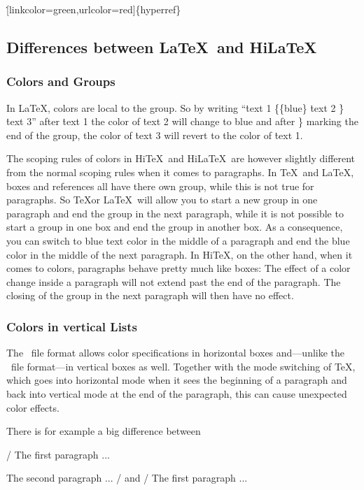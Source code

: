 \.{[linkcolor=green,urlcolor=red]\{hyperref\}}

\subsection{Differences between \LaTeX\ and Hi\LaTeX}

\subsubsection{Colors and Groups}
In \LaTeX, colors are local to the group. So by writing
``\.{text 1} \.{\{}\.{\{blue\}} \.{text 2} \.{\}} \.{text 3}''
after \.{text 1} the color of \.{text 2} will change to  blue and after \.{\}}
marking the end of the group, the color of \.{text 3} will revert to the
color of \.{text 1}.

The scoping rules of colors in Hi\TeX\ and Hi\LaTeX\ are however slightly
different from the normal scoping rules when it comes to paragraphs.
In \TeX\ and \LaTeX, boxes and references all have there own group,
while this is not true for paragraphs.
So \TeX or \LaTeX\ will allow you to start a new group in one paragraph and
end the group in the next paragraph, while it is not possible to start a
group in one box and end the group in another box. As a consequence,
you can switch to blue text color in the middle of a paragraph and end the blue
color in the middle of the next paragraph.
In Hi\TeX, on the other hand, when it comes to colors,
paragraphs behave pretty much like boxes: The effect of a color change inside
a paragraph will not extend past the end of the paragraph. The closing of the
group in the next paragraph will then have no effect.

\subsubsection{Colors in vertical Lists}
The \HINT\ file format allows color specifications in horizontal boxes
and---unlike the \PDF\ file format---in vertical boxes as well.
Together with the mode switching of \TeX, which goes into horizontal mode
when it sees the beginning of a paragraph and back into vertical mode at
the end of the paragraph, this can cause unexpected color effects.

There is for example a big difference between

\medskip
\verbatim/\color{blue}
The first paragraph ...

The second paragraph ...
/
\medskip
and
\medskip
\verbatim/\indent
\color{blue}
The first paragraph ...

